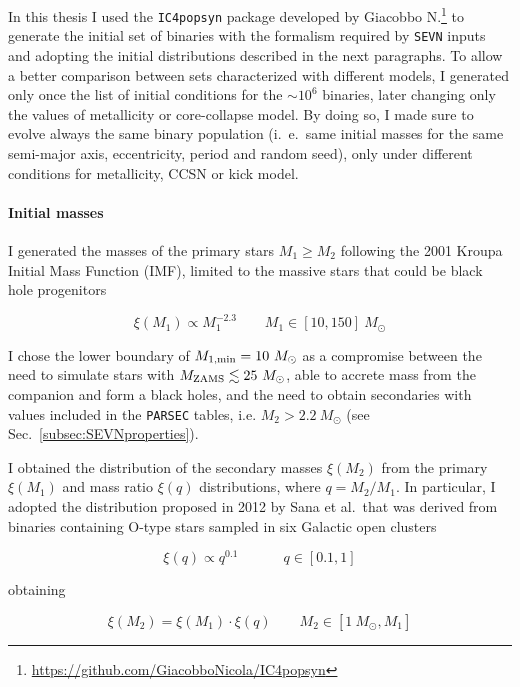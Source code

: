 \documentclass[a4paper,titlepage]{book}     	%
\newcommand{\sun}{\ensuremath{_\odot}}
\newcommand{\mzams}{M_\textup{ZAMS}}
\newcommand{\msun}{\ensuremath{M\sun}}
\begin{document}
In this thesis I used the \texttt{IC4popsyn} package developed by Giacobbo N.\footnote{\url{https://github.com/GiacobboNicola/IC4popsyn}} to generate the initial set of binaries with the formalism required by \texttt{SEVN} inputs and adopting the initial distributions described in the next paragraphs. To allow a better comparison between sets characterized with different models, I generated only once the list of initial conditions for the $\sim 10^6$ binaries, later changing only the values of metallicity or core-collapse model. By doing so, I made sure to evolve always the same binary population (i.\ e.\ same initial masses for the same semi-major axis, eccentricity, period and random seed), only under different conditions for metallicity, CCSN or kick model.

\paragraph{Initial masses} I generated the masses of the primary stars $M_1 \geq M_2$ following the 2001 Kroupa \cite{Kroupa2001} Initial Mass Function (IMF), limited to the massive stars that could be black hole progenitors

\begin{equation}
	\xi(M_1) \propto M_1^{-2.3} \qquad M_1 \in [10,150]~\msun 
\end{equation}

I chose the lower boundary of $M_\textup{1,min} = 10~\msun$ as a compromise between the need to simulate stars with $\mzams \lesssim 25~\msun$, able to accrete mass from the companion and form a black holes, and the need to obtain secondaries with values included in the \texttt{PARSEC} tables, i.e. $M_2 > 2.2~\msun$ (see Sec.\ \ref{subsec:SEVNproperties}).

I obtained the distribution of the secondary masses $\xi(M_2)$ from the primary $\xi(M_1)$ and mass ratio $\xi(q)$ distributions, where $q=M_2/M_1$. In particular, I adopted the distribution proposed in 2012 by Sana et al.\ that was derived from binaries containing O-type stars sampled in six Galactic open clusters

\begin{equation}
\xi(q) \propto q^{0.1} \qquad \quad ~q \in [0.1,1] 
\end{equation}

obtaining

\begin{equation}
\xi(M_2) = \xi(M_1) \cdot \xi(q)  \qquad  M_2 \in [1 ~\msun , M_1]
\end{equation}
\end{document}
